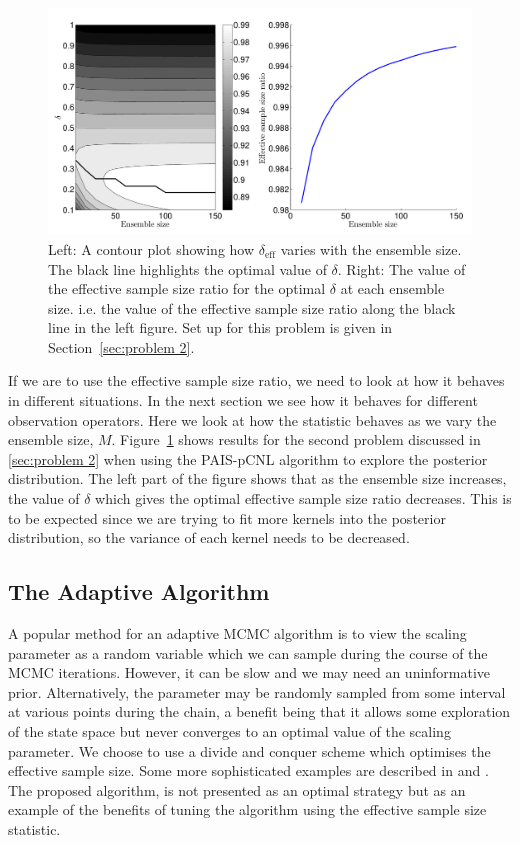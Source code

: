 \documentclass[final]{siamltex}
\begin{document}
\begin{figure}[htpb]
\begin{center}
\includegraphics[width=\textwidth]{figures/neff-M}
\caption{Left: A contour plot showing how $\delta_{\text{eff}}$ varies with the ensemble size. The black line highlights the optimal value of $\delta$. Right: The value of the effective sample size ratio for the optimal $\delta$ at each ensemble size. i.e. the value of the effective sample size ratio along the black line in the left figure. Set up for this problem is given in Section~\ref{sec:problem 2}.}
\label{fig:neff-M}
\end{center}
\end{figure}

If we are to use the effective sample size ratio, we need to look at how it behaves in different situations. In the next section we see how it behaves for different observation operators. Here we look at how the statistic behaves as we vary the ensemble size, $M$. Figure~\ref{fig:neff-M} shows results for the second problem discussed in \ref{sec:problem 2} when using the PAIS-pCNL algorithm to explore the posterior distribution. The left part of the figure shows that as the ensemble size increases, the value of $\delta$ which gives the optimal effective sample size ratio decreases. This is to be expected since we are trying to fit more kernels into the posterior distribution, so the variance of each kernel needs to be decreased.

\subsection{The Adaptive Algorithm}\label{sec:adapt}

A popular method for an adaptive MCMC algorithm is to view the scaling parameter as a random variable which we can sample during the course of the MCMC iterations. However, it can be slow and we may need an uninformative prior. Alternatively, the parameter may be randomly sampled from some interval at various points during the chain, a benefit being that it allows some exploration of the state space but never converges to an optimal value of the scaling parameter. We choose to use a divide and conquer scheme which optimises the effective sample size. Some more sophisticated examples are described in \cite{roberts2009examples} and \cite{Ji2013adaptive}. The proposed algorithm, is not presented as an optimal strategy but as an example of the benefits of tuning the algorithm using the effective sample size statistic.
\end{document}
